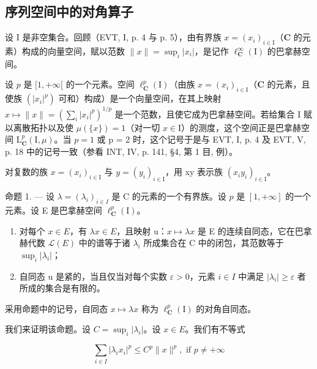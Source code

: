 \subsection{序列空间中的对角算子}

设 I 是非空集合。回顾（EVT, I, p. 4 与 p. 5），由有界族 \(x = (x_i)_{i \in \mathrm{I}}\)（\(\mathbf{C}\) 的元素）构成的向量空间，赋以范数 \(\| x \| = \sup_i |x_i|\)，是记作 \(\ell_{\mathbf{C}}^{\infty}(\mathrm{I})\) 的巴拿赫空间。

设 \(p\) 是 \([1, +\infty[\) 的一个元素。空间 \(\ell_{\mathbf{C}}^{p}(\mathrm{I})\)（由族 \(x = (x_{i})_{i \in \mathrm{I}}\)（\(\mathbf{C}\) 的元素，且使族 \((|x_{i}|^{p})\) 可和）构成）是一个向量空间，在其上映射 \(x \mapsto \| x \| = (\sum_{i} |x_{i}|^{p})^{1/p}\) 是一个范数，且使它成为巴拿赫空间。若给集合 I 赋以离散拓扑以及使 \(\mu(\{x\}) = 1\)（对一切 \(x \in \mathrm{I}\)）的测度，这个空间正是巴拿赫空间 \(\mathrm{L}_{\mathbf{C}}^{p}(\mathrm{I}, \mu)\)。当 \(p = 1\) 或 p = 2 时，这个记号于是与 EVT, I, p. 4 及 EVT, V, p. 18 中的记号一致（参看 INT, IV, p. 141, §4, 第 1 目, 例）。

对复数的族 \(x = (x_{i})_{i \in \mathrm{I}}\) 与 \(y = (y_{i})_{i \in \mathrm{I}}\)，用 xy 表示族 \((x_{i}y_{i})_{i \in \mathrm{I}}\)。

命题 1. --- 设 \(\lambda = (\lambda_i)_{i\in I}\) 是 C 的元素的一个有界族。设 \(p\) 是 \([1, +\infty]\) 的一个元素。设 E 是巴拿赫空间 \(\ell_{\mathbf{C}}^p (\mathrm{I})\)。

\begin{enumerate}
\def\labelenumi{\alph{enumi})}
\item
  对每个 \(x \in E\)，有 \(\lambda x \in E\)，且映射 u：\(x \mapsto \lambda x\) 是 E 的连续自同态，它在巴拿赫代数 \(\mathcal{L}(E)\) 中的谱等于诸 \(\lambda_{i}\) 所成集合在 C 中的闭包，其范数等于 \(\sup_{i} |\lambda_{i}|\)；
\item
  自同态 u 是紧的，当且仅当对每个实数 \(\varepsilon > 0\)，元素 \(i \in I\) 中满足 \(|\lambda_{i}| \geqslant \varepsilon\) 者所成的集合是有限的。
\end{enumerate}

采用命题中的记号，自同态 \(x \mapsto \lambda x\) 称为 \(\ell_{\mathbf{C}}^{p}(\mathrm{I})\) 的对角自同态。

我们来证明该命题。设 \(C = \sup_{i} |\lambda_{i}|\)。设 \(x \in E\)。我们有不等式

\[
\sum_ {i \in I} | \lambda_ {i} x _ {i} | ^ {p} \leqslant C ^ {p} \| x \| ^ {p}, \text {   if   } p \neq + \infty
\]

